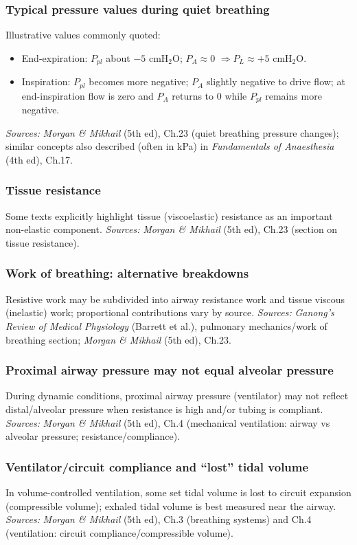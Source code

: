 \documentclass[11pt,a4paper]{article}
\begin{document}
\subsubsection{Typical pressure values during quiet breathing}
Illustrative values commonly quoted:
\begin{itemize}
  \item End-expiration: $P_{pl}$ about $-5$ cmH$_2$O; $P_A \approx 0$ $\Rightarrow P_L \approx +5$ cmH$_2$O.
  \item Inspiration: $P_{pl}$ becomes more negative; $P_A$ slightly negative to drive flow; at end-inspiration flow is zero and $P_A$ returns to 0 while $P_{pl}$ remains more negative.
\end{itemize}
\textit{Sources:} \emph{Morgan \& Mikhail} (5th ed), Ch.23 (quiet breathing pressure changes); similar concepts also described (often in kPa) in \emph{Fundamentals of Anaesthesia} (4th ed), Ch.17.

\subsubsection{Tissue resistance}
Some texts explicitly highlight tissue (viscoelastic) resistance as an important non-elastic component.
\textit{Sources:} \emph{Morgan \& Mikhail} (5th ed), Ch.23 (section on tissue resistance).

\subsubsection{Work of breathing: alternative breakdowns}
Resistive work may be subdivided into airway resistance work and tissue viscous (inelastic) work; proportional contributions vary by source.
\textit{Sources:} \emph{Ganong's Review of Medical Physiology} (Barrett et al.), pulmonary mechanics/work of breathing section; \emph{Morgan \& Mikhail} (5th ed), Ch.23.

\subsubsection{Proximal airway pressure may not equal alveolar pressure}
During dynamic conditions, proximal airway pressure (ventilator) may not reflect distal/alveolar pressure when resistance is high and/or tubing is compliant.
\textit{Sources:} \emph{Morgan \& Mikhail} (5th ed), Ch.4 (mechanical ventilation: airway vs alveolar pressure; resistance/compliance).

\subsubsection{Ventilator/circuit compliance and ``lost'' tidal volume}
In volume-controlled ventilation, some set tidal volume is lost to circuit expansion (compressible volume); exhaled tidal volume is best measured near the airway.
\textit{Sources:} \emph{Morgan \& Mikhail} (5th ed), Ch.3 (breathing systems) and Ch.4 (ventilation: circuit compliance/compressible volume).
\end{document}
